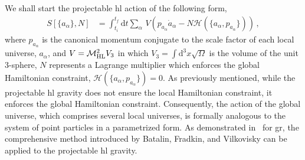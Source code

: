 \documentclass[superscriptaddress,aps,preprintnumbers,nofootinbib]{revtex4-2}
\begin{document}
We shall start the projectable \ac{hl} action of the following form, 
\begin{align}
S\left[\{a_{\alpha}\},N\right] &=  \int_{t_i}^{t_f}\mathrm{d} t \sum_{\alpha}\, V\!\left(p_{a_{\alpha}}\dot{a}_{\alpha}- N \mathcal{H}(\{a_{\alpha},p_{a_{\alpha}}\}) \right)\,,
\end{align}
where $p_{a_{\alpha}}$ is the canonical momentum conjugate to the scale factor of each local universe, $a_{\alpha}$, and $V={\cal M}_{\rm HL}^{2}V_3$ in which $V_3=\int \mathrm{d}^3 x\sqrt{\Omega}$ is the volume of the unit $3$-sphere, $N$ represents a Lagrange multiplier which enforces the global Hamiltonian constraint, $\mathcal{H}(\{a_{\alpha},p_{a_{\alpha}}\})=0$. As previously mentioned, while the projectable \ac{hl} gravity does not ensure the local Hamiltonian constraint, it enforces the global Hamiltonian constraint. Consequently, the action of the global universe, which comprises several local universes, is formally analogous to the system of point particles in a parametrized form. As demonstrated in~\cite{Halliwell:1988wc} for \ac{gr}, the comprehensive method introduced by Batalin, Fradkin, and Vilkovisky can be applied to the projectable \ac{hl} gravity.
\end{document}
